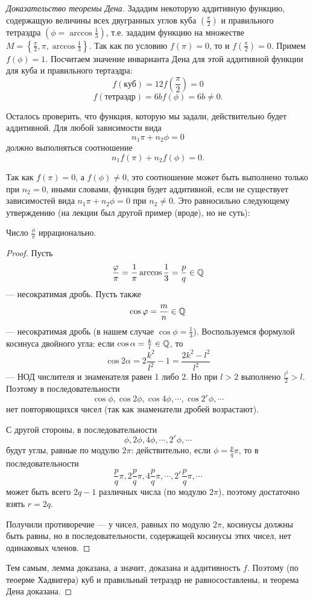 \begin{proof}[Доказательство теоремы Дена]
    Зададим некоторую аддитивную функцию, содержащую величины всех двугранных углов куба $\left(\frac{\pi}{2}\right)$ и правильного тетраэдра $\left(\phi = \arccos{\frac{1}{3}}\right)$, т.е. зададим функцию на множестве $M = \left\{\frac{\pi}{2}, \pi, \arccos{\frac{1}{3}}\right\}$.
    Так как по условию $f(\pi) = 0$, то и $f(\frac{\pi}{2}) = 0$. Примем $f(\phi) = 1$. Посчитаем значение инварианта Дена для этой аддитивной функции для куба и правильного тертаэдра:
    \[f(\text{куб}) = 12 f(\frac{\pi}{2}) = 0\]
    \[f(\text{тетраэдр}) = 6bf(\phi) = 6b \neq 0.\]

    Осталось проверить, что функция, которую мы задали, действительно будет аддитивной. Для любой зависимости вида $$n_1 \pi + n_2 \phi = 0$$ должно выполняться соотношение $$n_1 f(\pi) + n_2 f(\phi) = 0.$$

    Так как $f(\pi) = 0$, а $f(\phi) \neq 0$, это соотношение может быть выполнено только при $n_2 = 0$, иными словами, функция будет аддитивной, если не существует зависимостей вида $n_1 \pi + n_2 \phi = 0$ при $n_2 \neq 0$. Это равносильно следующему утверждению (на лекции был другой пример (вроде), но не суть):

    \begin{lemma}
        Число $\frac{\phi}{\pi}$ иррационально.
    \end{lemma} 
    \begin{proof}
        Пусть $$\frac{\varphi}{\pi} = \frac{1}{\pi} \arccos{\frac{1}{3}} = \frac{p}{q} \in \mathbb{Q}$$ — несократимая дробь.
        Пусть также $$\cos{\varphi} = \frac{m}{n} \in \mathbb{Q}$$ — несократимая дробь (в нашем случае $\cos{\phi} = \frac{1}{3}$).
        Воспользуемся формулой косинуса двойного угла: если $\cos{\alpha} = \frac{k}{l} \in \mathbb{Q}$, то
        $$\cos{2\alpha} = 2 \frac{k^2}{l^2} - 1 = \frac{2k^2 - l^2}{l^2}$$ — НОД числителя и знаменателя равен 1 либо 2. Но при $l > 2$ выполнено $\frac{l^2}{2} > l$. Поэтому в последовательности $$\cos{\phi}, \cos{2\phi}, \cos{4\phi}, \cdots, \cos{2^r \phi}, \cdots$$ нет повторяющихся чисел (так как знаменатели дробей возрастают).

        С другой стороны, в последовательности
        $$\phi, 2\phi, 4\phi, \cdots, 2^r \phi, \cdots$$
        будут углы, равные по модулю $2 \pi$: действительно, если $\phi = \frac{p}{q} \pi$, то в последовательности
        $$\frac{p}{q} \pi, 2 \frac{p}{q} \pi, 4 \frac{p}{q} \pi, \cdots, 2^r \frac{p}{q} \pi, \cdots$$
        может быть всего $2q - 1$ различных числа (по модулю $2 \pi$), поэтому достаточно взять $r = 2q$.

        Получили противоречие — у чисел, равных по модулю $2 \pi$, косинусы должны быть равны, но в последовательности, содержащей косинусы этих чисел, нет одинаковых членов.
    \end{proof}
    Тем самым, лемма доказана, а значит, доказана и аддитивность $f$. Поэтому (по теоерме Хадвигера) куб и правильный тетраэдр не равносоставлены, и теорема Дена доказана.
\end{proof}

